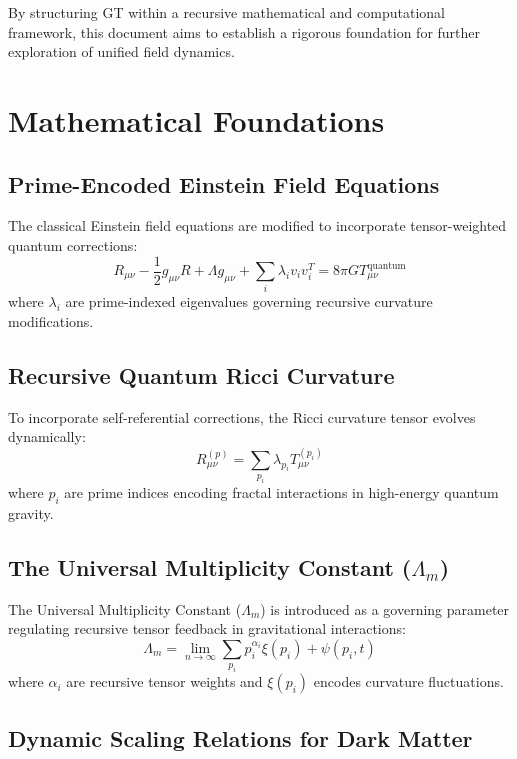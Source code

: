 \documentclass{article}
\theoremstyle{plain}
\begin{document}
By structuring GT within a recursive mathematical and computational framework, this document aims to establish a rigorous foundation for further exploration of unified field dynamics.

\section{Mathematical Foundations}

\subsection{Prime-Encoded Einstein Field Equations}
The classical Einstein field equations are modified to incorporate tensor-weighted quantum corrections:
\begin{equation}
R_{\mu\nu} - \frac{1}{2} g_{\mu\nu} R + \Lambda g_{\mu\nu} + \sum_{i} \lambda_i v_i v_i^T = 8 \pi G T_{\mu\nu}^{\text{quantum}}
\end{equation}
where \(\lambda_i\) are prime-indexed eigenvalues governing recursive curvature modifications.

\subsection{Recursive Quantum Ricci Curvature}
To incorporate self-referential corrections, the Ricci curvature tensor evolves dynamically:
\begin{equation}
R_{\mu\nu}^{(p)} = \sum_{p_i} \lambda_{p_i} T_{\mu\nu}^{(p_i)}
\end{equation}
where \(p_i\) are prime indices encoding fractal interactions in high-energy quantum gravity.

\subsection{The Universal Multiplicity Constant (\(\Lambda_m\))}

The Universal Multiplicity Constant (\(\Lambda_m\)) is introduced as a governing parameter regulating recursive tensor feedback in gravitational interactions:
\begin{equation}
\Lambda_m = \lim_{n \to \infty} \sum_{p_i} p_i^{\alpha_i} \xi(p_i) + \psi(p_i, t)
\end{equation}
where \(\alpha_i\) are recursive tensor weights and \(\xi(p_i)\) encodes curvature fluctuations.

\subsection{Dynamic Scaling Relations for Dark Matter}
\end{document}

